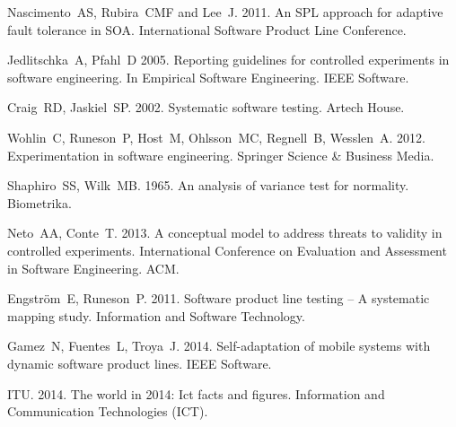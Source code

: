 \documentclass[preprint,12pt]{elsarticle}
\begin{document}
\begin{thebibliography}{33}
 Nascimento~AS, Rubira~CMF and Lee~J. 2011. An SPL approach for adaptive fault tolerance in SOA. International Software Product Line Conference.

 Jedlitschka~A, Pfahl~D 2005. Reporting guidelines for controlled experiments in software engineering. In Empirical Software Engineering. IEEE Software.

 Craig~RD, Jaskiel~SP. 2002. Systematic software testing. Artech House.

 Wohlin~C, Runeson~P, Host~M, Ohlsson~MC, Regnell~B, Wesslen~A. 2012. Experimentation in software engineering. Springer Science \& Business Media.

 Shaphiro~SS, Wilk~MB. 1965. An analysis of variance test for normality. Biometrika.

 Neto~AA, Conte~T. 2013. A conceptual model to address threats to validity in controlled experiments. International Conference on Evaluation and Assessment in Software Engineering. ACM.

 Engstr\"{o}m~E, Runeson~P. 2011. Software product line testing -- A systematic mapping study. Information and Software Technology.

 Gamez~N, Fuentes~L, Troya~J. 2014. Self-adaptation of mobile systems with dynamic software product lines. IEEE Software.

 ITU. 2014. The world in 2014: Ict facts and figures. Information and Communication Technologies (ICT).

\end{thebibliography}
\end{document}
